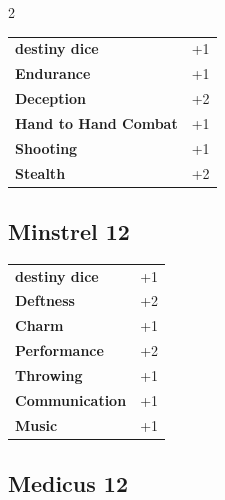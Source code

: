 \begin{multicols}{2}
\begin{tcolorbox}
\begin{tabular}{@{}ll@{}}
    \textbf{destiny dice} & +1\\
    \textbf{Endurance} & +1\\
    \textbf{Deception} & +2\\
    \textbf{Hand to Hand Combat} & +1\\
    \textbf{Shooting} & +1\\
    \textbf{Stealth} & +2\\
\end{tabular}


\end{tcolorbox}

\begin{tcolorbox}
    \subsection*{Minstrel \hfill \small{12 }}
    \tcblower




\begin{tabular}{@{}ll@{}}
    \textbf{destiny dice} & +1\\
    \textbf{Deftness} & +2\\
    \textbf{Charm} & +1\\
    \textbf{Performance} & +2\\
    \textbf{Throwing} & +1\\
    \textbf{Communication} & +1\\
    \textbf{Music} & +1\\
\end{tabular}


\end{tcolorbox}

\begin{tcolorbox}
    \subsection*{Medicus \hfill \small{12 }}
    \tcblower





\end{tcolorbox}
\end{multicols}
